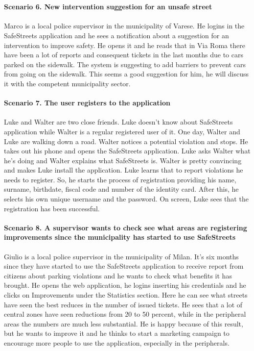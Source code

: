 \documentclass[a4paper]{report}
\begin{document}
\\ 
\\
\textbf{Scenario 6. New intervention suggestion for an unsafe street}\\
\\
Marco is a local police supervisor in the municipality of Varese. He logins in the SafeStreets application and he sees a notification about a suggestion for an intervention to improve safety. He opens it and he reads that in Via Roma there have been a lot of reports and consequent tickets in the last months due to cars parked on the sidewalk. The system is suggesting to add barriers to prevent cars from going on the sidewalk. This seems a good suggestion for him, he will discuss it with the competent municipality sector. 
\\
\\
\textbf{Scenario 7. The user registers to the application}\\
\\
Luke and Walter are two close friends. Luke doesn’t know about SafeStreets application while Walter is a regular registered user of it. One day, Walter and Luke are walking down a road. Walter notices a potential violation and stops. He takes out his phone and opens the SafeStreets application. Luke asks Walter what he’s doing and Walter explains what SafeStreets is. Walter is pretty convincing and makes Luke install the application. Luke learns that to report violations he needs to register. So, he starts the process of registration providing his name, surname, birthdate, fiscal code and number of the identity card. After this, he selects his own unique username and the password. On screen, Luke sees that the registration has been successful. 
\\
\\
\textbf{Scenario 8. A supervisor wants to check see what areas are registering improvements since the municipality has started to use SafeStreets}\\
\\
Giulio is a local police supervisor in the municipality of Milan. It’s six months since they have started to use the SafeStreets application to receive report from citizens about parking violations and he wants to check what benefits it has brought. He opens the web application, he logins inserting his credentials and he clicks on Improvements under the Statistics section. Here he can see what streets have seen the best reduces in the number of issued tickets. He sees that a lot of central zones have seen reductions from 20 to 50 percent, while in the peripheral areas the numbers are much less substantial. He is happy because of this result, but he wants to improve it and he thinks to start a marketing campaign to encourage more people to use the application, especially in the peripherals. 
\end{document}
